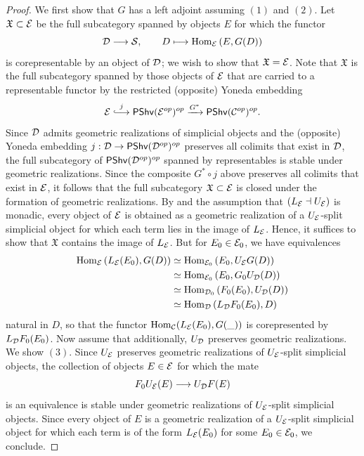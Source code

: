 \documentclass[10pt, reqno, twoside
, final
]{amsart}
\numberwithin{equation}{subsection}%
\theoremstyle{definition}
\theoremstyle{definition}
\theoremstyle{definition}
\theoremstyle{definition}
\theoremstyle{definition}
\theoremstyle{definition}
\theoremstyle{definition}
\theoremstyle{definition}
\theoremstyle{definition}
\theoremstyle{plain}
\theoremstyle{definition}
\theoremstyle{plain}
\theoremstyle{definition}
\theoremstyle{plain}
\theoremstyle{definition}
\theoremstyle{definition}
\theoremstyle{plain}
\theoremstyle{plain}
\theoremstyle{definition}
\theoremstyle{plain}
\theoremstyle{plain}
\theoremstyle{plain}
\begin{document}
\begin{proof} 
We first show that $G$ has a left adjoint assuming $(1)$ and $(2)$. Let $\mathfrak{X}\subset \mathcal{E}$ be the full subcategory spanned by objects $E$ for which the functor
\[  \mathcal{D} \longrightarrow \mathcal{S},\quad \quad D\longmapsto \mathrm{Hom}_{\mathcal{E}}\left(E,G(D)\right)  \]
is corepresentable by an object of $\mathcal{D}$; we wish to show that $\mathfrak{X}=\mathcal{E}$. Note that $\mathfrak{X}$ is the full subcategory spanned by those objects of $\mathcal{E}$ that are carried to a representable functor by the restricted (opposite) Yoneda embedding
\[  \icate\overset{j}{\hooklongrightarrow}\pshv(\icate^{op})^{op} \xrightarrow{G^*} \pshv(\icat^{op})^{op}.  \]
Since $\mathcal{D}$ admits geometric realizations of simplicial objects and the (opposite) Yoneda embedding $j:\mathcal{D}\rightarrow \mathsf{PShv}(\mathcal{D}^{op})^{op}$ preserves all colimits that exist in $\mathcal{D}$, the full subcategory of $\mathsf{PShv}(\mathcal{D}^{op})^{op}$ spanned by representables is stable under geometric realizations. Since the composite $G^*\circ j$ above preserves all colimits that exist in $\mathcal{E}$, it follows that the full subcategory $\mathfrak{X}\subset\mathcal{E}$ is closed under the formation of geometric realizations. By \cite[Proposition 4.7.3.14]{LurHA} and the assumption that $(L_{\mathcal{E}}\dashv U_{\mathcal{E}})$ is monadic, every object of $\mathcal{E}$ is obtained as a geometric realization of a $U_{\mathcal{E}}$-split simplicial object for which each term lies in the image of $L_{\mathcal{E}}$. Hence, it suffices to show that $\mathfrak{X}$ contains the image of $L_{\mathcal{E}}$. But for $E_0\in \mathcal{E}_0$, we have equivalences 
\begin{align*}
    \mathrm{Hom}_{\mathcal{E}}\left(L_{\mathcal{E}}(E_0),G(D)\right) &\simeq  \mathrm{Hom}_{\mathcal{E}_0}\left(E_0,U_{\mathcal{E}}G(D)\right) \\
    &\simeq \mathrm{Hom}_{\mathcal{E}_0}\left(E_0,G_0U_{\mathcal{D}}(D)\right) \\
     &\simeq \mathrm{Hom}_{\mathcal{D}_0}\left(F_0(E_0),U_{\mathcal{D}}(D)\right) \\
      &\simeq \mathrm{Hom}_{\mathcal{D}}\left(L_{\mathcal{D}}F_0(E_0),D\right) 
\end{align*}
natural in $D$, so that the functor $\mathrm{Hom}_{\mathcal{C}}(L_{\mathcal{E}}(E_0),G(\_))$ is corepresented by $L_{\mathcal{D}}F_0(E_0)$. Now assume that additionally, $U_{\mathcal{D}}$ preserves geometric realizations. We show $(3)$. Since $U_{\mathcal{E}}$ preserves geometric realizations of $U_{\mathcal{E}}$-split simplicial objects, the collection of objects $E\in \mathcal{E}$ for which the mate
\[  F_0U_{\mathcal{E}}(E)\longrightarrow U_{\mathcal{D}}F(E)  \]
is an equivalence is stable under geometric realizations of $U_{\mathcal{E}}$-split simplicial objects. Since every object of $E$ is a geometric realization of a $U_{\mathcal{E}}$-split simplicial object for which each term is of the form $L_{\mathcal{E}}(E_0)$ for some $E_0\in\mathcal{E}_0$, we conclude.
\end{proof}
\end{document}
